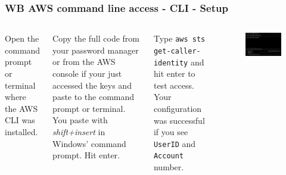 \documentclass[aspectratio=169]{beamer} %
\begin{document}
\begin{frame}
	\frametitle{WB AWS command line access - CLI - Setup}
	\begin{columns}[c]
		
		Open the command prompt or terminal where the AWS CLI was installed.
		
		\vspace{.5cm}
		
		Copy the full code from your password manager or
		from the AWS console if your just accessed the keys
		and paste to the command prompt or terminal. 
		You paste with \textit{shift+insert} 
		in Windows' command prompt.
		Hit enter.
		
		\vspace{.5cm} 
		
		Type \texttt{aws sts get-caller-identity} 
		and hit enter to test access. 
		Your configuration was successful if you see
		\texttt{UserID} and \texttt{Account} number.
		
		\begin{figure}
			\centering
			\includegraphics[width=1\textwidth]{./img/aws-cli-configure.png}
		\end{figure}
		
	\end{columns}
\end{frame}
\end{document}
